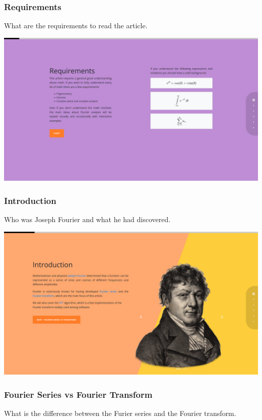 \documentclass{article}
\begin{document}
\pagebreak

\subsubsection{Requirements}

What are the requirements to read the article.

\includegraphics[width=\textwidth]{chap2.png}

\subsubsection{Introduction}

Who was Joseph Fourier and what he had discovered.

\includegraphics[width=\textwidth]{chap3.png}

\subsubsection{Fourier Series vs Fourier Transform}

What is the difference between the Furier series and the Fourier transform.
\end{document}
